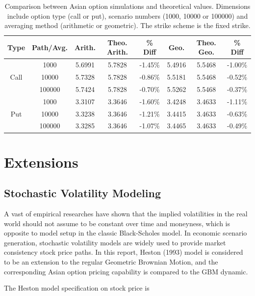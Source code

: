 \documentclass[a4paper,11pt] {article}
\begin{document}
\begin{table}[htb]
\begin{center}
\begin{tabular}{c||c|c|c|c|c|c|c}
  \hline
  Type & Path/Avg. & Arith. & Theo. Arith. & \% Diff & Geo. & Theo. Geo. & \% Diff \\ \hline
\multirow{3}{*}{Call}	&	1000	&	5.6991	&	5.7828	&	-1.45\%	&	5.4916	&	5.5468	&	-1.00\%	\\
	&	10000	&	5.7328	&	5.7828	&	-0.86\%	&	5.5181	&	5.5468	&	-0.52\%	\\
	&	100000	&	5.7424	&	5.7828	&	-0.70\%	&	5.5262	&	5.5468	&	-0.37\%	\\ \hline
\multirow{3}{*}{Put}	&	1000	&	3.3107	&	3.3646	&	-1.60\%	&	3.4248	&	3.4633	&	-1.11\%	\\
	&	10000	&	3.3238	&	3.3646	&	-1.21\%	&	3.4415	&	3.4633	&	-0.63\%	\\
	&	100000	&	3.3285	&	3.3646	&	-1.07\%	&	3.4465	&	3.4633	&	-0.49\%	\\
  \hline
\end{tabular}
\caption{Comparison between Asian option simulations and theoretical values. Dimensions include option type (call or put), scenario numbers (1000, 10000 or 100000) and averaging method (arithmetic or geometric). The strike scheme is the fixed strike.}
\label{table::theo_vs_empi}
\end{center}
\end{table}


\section{Extensions}
\subsection{Stochastic Volatility Modeling}
A vast of empirical researches have shown that the implied volatilities in the real world should not assume to be constant over time and moneyness, which is opposite to model setup in the classic Black-Scholes model. In economic scenario generation, stochastic volatility models are widely used to provide market consistency stock price paths. In this report, Heston (1993) model is considered to be an extension to the regular Geometric Brownian Motion, and the corresponding Asian option pricing capability is compared to the GBM dynamic.

The Heston model specification on stock price is
\end{document}
